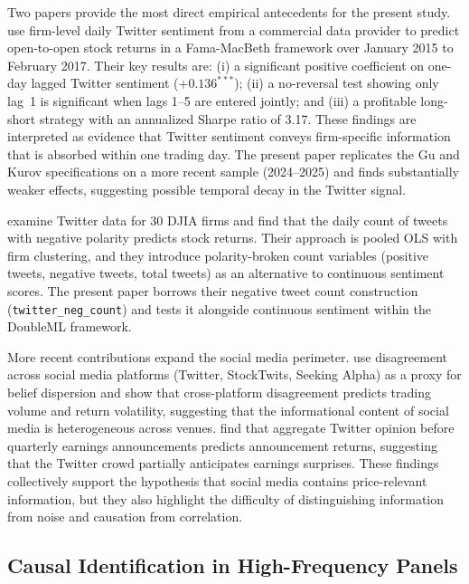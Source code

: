Two papers provide the most direct empirical antecedents for the present study.
\citet{gu2020} use firm-level daily Twitter sentiment from a commercial data provider to predict
open-to-open stock returns in a Fama-MacBeth framework over January 2015 to February 2017. Their
key results are: (i) a significant positive coefficient on one-day lagged Twitter sentiment
($+0.136^{***}$); (ii) a no-reversal test showing only lag~1 is significant when lags 1--5 are
entered jointly; and (iii) a profitable long-short strategy with an annualized Sharpe ratio of
3.17. These findings are interpreted as evidence that Twitter sentiment conveys firm-specific
information that is absorbed within one trading day. The present paper replicates the Gu and Kurov
specifications on a more recent sample (2024--2025) and finds substantially weaker effects,
suggesting possible temporal decay in the Twitter signal.

\citet{teti2019} examine Twitter data for 30 DJIA firms and find that the daily count of tweets
with negative polarity predicts stock returns. Their approach is pooled OLS with firm clustering,
and they introduce polarity-broken count variables (positive tweets, negative tweets, total
tweets) as an alternative to continuous sentiment scores. The present paper borrows their negative
tweet count construction (\texttt{twitter\_neg\_count}) and tests it alongside continuous
sentiment within the DoubleML framework.

More recent contributions expand the social media perimeter. \citet{cookson2023} use disagreement
across social media platforms (Twitter, StockTwits, Seeking Alpha) as a proxy for belief
dispersion and show that cross-platform disagreement predicts trading volume and return
volatility, suggesting that the informational content of social media is heterogeneous across
venues. \citet{bartov2018} find that aggregate Twitter opinion before quarterly earnings
announcements predicts announcement returns, suggesting that the Twitter crowd partially
anticipates earnings surprises. These findings collectively support the hypothesis that social
media contains price-relevant information, but they also highlight the difficulty of distinguishing
information from noise and causation from correlation.

\subsection{Causal Identification in High-Frequency Panels}
\label{sec:lit_causal}

